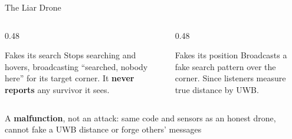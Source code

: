 \documentclass[aspectratio=169,10pt]{beamer}
\begin{document}
\begin{frame}{The Liar Drone}
\centering
{}

\vspace{1em}
\raggedright
\begin{columns}[T]
\begin{column}{0.48\textwidth}
\begin{block}{Fakes its search}
Stops searching and hovers, broadcasting ``searched, nobody here'' for its target corner. It \textbf{never reports} any survivor it sees.
\end{block}
\end{column}
\begin{column}{0.48\textwidth}
\begin{block}{Fakes its position}
Broadcasts a fake search pattern over the corner. Since listeners measure true distance by UWB.
\end{block}
\end{column}
\end{columns}

\vspace{0.8em}
\centering
\small A \textbf{malfunction}, not an attack: same code and sensors as an honest drone, cannot fake a UWB distance or forge others' messages
\end{frame}
\end{document}
